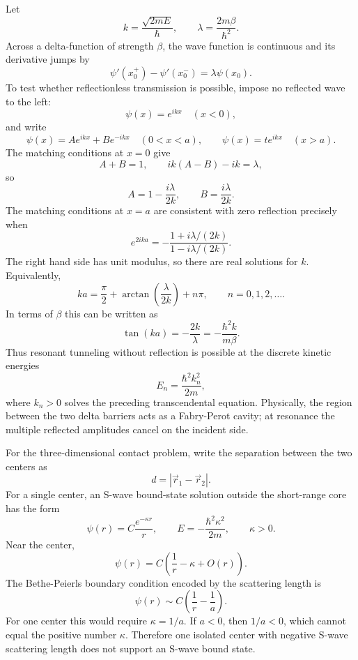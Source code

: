 \begin{solution}
Let
\[
    k=\frac{\sqrt{2mE}}{\hbar},
    \qquad
    \lambda=\frac{2m\beta}{\hbar^2}.
\]
Across a delta-function of strength $\beta$, the wave function is continuous and its derivative jumps by
\[
    \psi'(x_0^+)-\psi'(x_0^-)=\lambda\psi(x_0).
\]
To test whether reflectionless transmission is possible, impose no reflected wave to the left:
\[
    \psi(x)=e^{ikx}\quad (x<0),
\]
and write
\[
    \psi(x)=Ae^{ikx}+Be^{-ikx}\quad (0<x<a),
    \qquad
    \psi(x)=te^{ikx}\quad (x>a).
\]
The matching conditions at $x=0$ give
\[
    A+B=1,
    \qquad
    ik(A-B)-ik=\lambda,
\]
so
\[
    A=1-\frac{i\lambda}{2k},
    \qquad
    B=\frac{i\lambda}{2k}.
\]
The matching conditions at $x=a$ are consistent with zero reflection precisely when
\[
    e^{2ika}
    =-\frac{1+i\lambda/(2k)}{1-i\lambda/(2k)} .
\]
The right hand side has unit modulus, so there are real solutions for $k$. Equivalently,
\[
    ka=\frac{\pi}{2}+\arctan\left(\frac{\lambda}{2k}\right)+n\pi,
    \qquad n=0,1,2,\ldots .
\]
In terms of $\beta$ this can be written as
\[
    \tan(ka)=-\frac{2k}{\lambda}
    =-\frac{\hbar^2k}{m\beta}.
\]
Thus resonant tunneling without reflection is possible at the discrete kinetic energies
\[
    E_n=\frac{\hbar^2k_n^2}{2m},
\]
where $k_n>0$ solves the preceding transcendental equation. Physically, the region between the two delta barriers acts as a Fabry-Perot cavity; at resonance the multiple reflected amplitudes cancel on the incident side.

For the three-dimensional contact problem, write the separation between the two centers as
\[
    d=|\vec r_1-\vec r_2|.
\]
For a single center, an S-wave bound-state solution outside the short-range core has the form
\[
    \psi(r)=C\frac{e^{-\kappa r}}{r},
    \qquad
    E=-\frac{\hbar^2\kappa^2}{2m},
    \qquad
    \kappa>0.
\]
Near the center,
\[
    \psi(r)=C\left(\frac{1}{r}-\kappa+O(r)\right).
\]
The Bethe-Peierls boundary condition encoded by the scattering length is
\[
    \psi(r)\sim C\left(\frac{1}{r}-\frac{1}{a}\right).
\]
For one center this would require $\kappa=1/a$. If $a<0$, then $1/a<0$, which cannot equal the positive number $\kappa$. Therefore one isolated center with negative S-wave scattering length does not support an S-wave bound state.


\end{solution}
